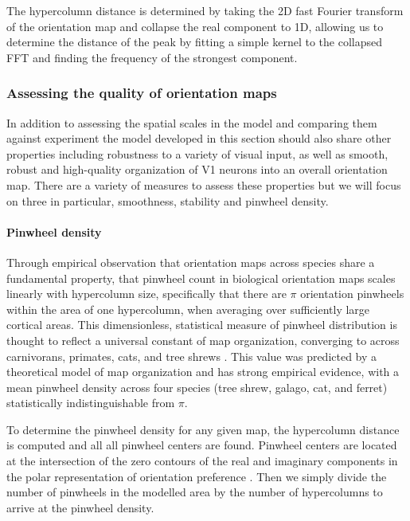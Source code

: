 The hypercolumn distance is determined by taking the 2D fast Fourier
transform of the orientation map and collapse the real component to
1D, allowing us to determine the distance of the peak by fitting a
simple kernel to the collapsed FFT and finding the frequency of the
strongest component.

\subsubsection{Assessing the quality of orientation maps}

In addition to assessing the spatial scales in the model and comparing
them against experiment the model developed in this section should
also share other properties including robustness to a variety of
visual input, as well as smooth, robust and high-quality organization
of V1 neurons into an overall orientation map. There are a variety of
measures to assess these properties but we will focus on three in
particular, smoothness, stability and pinwheel density.

\paragraph{Pinwheel density}

Through empirical observation that orientation maps across species
share a fundamental property, that pinwheel count in biological
orientation maps scales linearly with hypercolumn size, specifically
that there are $\pi$ orientation pinwheels within the area of one
hypercolumn, when averaging over sufficiently large cortical
areas. This dimensionless, statistical measure of pinwheel
distribution is thought to reflect a universal constant of map
organization, converging to across carnivorans, primates, cats, and
tree shrews \citep{Kaschube2010, Keil2012}. This value was predicted
by a theoretical model of map organization and has strong empirical
evidence, with a mean pinwheel density across four species (tree
shrew, galago, cat, and ferret) statistically indistinguishable from
$\pi$.

To determine the pinwheel density for any given map, the hypercolumn
distance is computed and all all pinwheel centers are found. Pinwheel
centers are located at the intersection of the zero contours of the
real and imaginary components in the polar representation of
orientation preference \citep{Lowel1998}. Then we simply divide the
number of pinwheels in the modelled area by the number of hypercolumns
to arrive at the pinwheel density.

